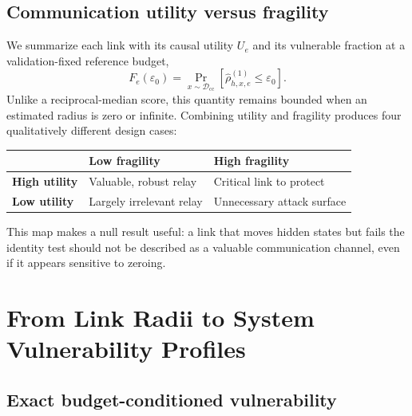 \documentclass[11pt]{article}
\newcommand{\cc}{\mathrm{cc}}
\newcommand{\eps}{\varepsilon}
\begin{document}
\subsection{Communication utility versus fragility}

We summarize each link with its causal utility $U_e$ and its vulnerable
fraction at a validation-fixed reference budget,
\begin{equation}
    F_e(\eps_0)
    =\Pr_{x\sim\mathcal D_{\cc}}
    [\widehat\rho_{h,x,e}^{(1)}\le\eps_0].
\end{equation}
Unlike a reciprocal-median score, this quantity remains bounded when an
estimated radius is zero or infinite. Combining utility and fragility produces
four qualitatively different design cases:
\begin{center}
\small
\begin{tabular}{lll}
\toprule
& \textbf{Low fragility} & \textbf{High fragility} \\
\midrule
\textbf{High utility} & Valuable, robust relay & Critical link to protect \\
\textbf{Low utility} & Largely irrelevant relay & Unnecessary attack surface \\
\bottomrule
\end{tabular}
\end{center}
This map makes a null result useful: a link that moves hidden states but fails
the identity test should not be described as a valuable communication channel,
even if it appears sensitive to zeroing.

\section{From Link Radii to System Vulnerability Profiles}
\label{sec:system-profile}

\subsection{Exact budget-conditioned vulnerability}
\end{document}
